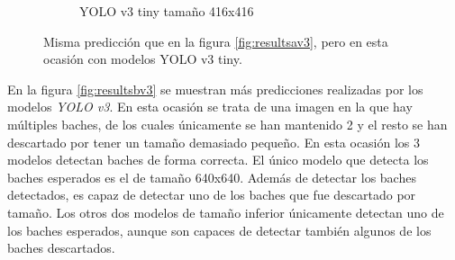 \begin{figure}[H]
\begin{subfigure}[h]{0.45\linewidth}
		\caption{YOLO v3 tiny tamaño 416x416}
	\end{subfigure}
	\caption{Misma predicción que en la figura \ref{fig:resultsav3}, pero en esta ocasión con modelos YOLO v3 tiny.}
	\label{fig:resultsav3tiny}
\end{figure}

En la figura \ref{fig:resultsbv3} se muestran más predicciones realizadas por los modelos \textit{YOLO v3}. En esta ocasión se trata de una imagen en la que hay múltiples baches, de los cuales únicamente se han mantenido 2 y el resto se han descartado por tener un tamaño demasiado pequeño. En esta ocasión los 3 modelos detectan baches de forma correcta. El único modelo que detecta los baches esperados es el de tamaño 640x640. Además de detectar los baches detectados, es capaz de detectar uno de los baches que fue descartado por tamaño. Los otros dos modelos de tamaño inferior únicamente detectan uno de los baches esperados, aunque son capaces de detectar también algunos de los baches descartados.

